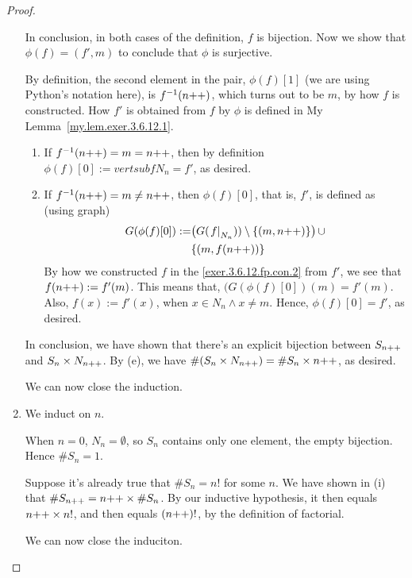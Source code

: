 \begin{proof}
\begin{enumerate}
		In conclusion, in both cases of the definition, $f$ is bijection. Now we show that $\phi(f) = (f', m)$ to conclude that $\phi$ is surjective.

		By definition, the second element in the pair, $\phi(f)[1]$ (we are using Python's notation here), is $f^{-1}(n{+}{+})$, which turns out to be $m$, by how $f$ is constructed.
		How $f'$ is obtained from $f$ by $\phi$ is defined in My Lemma~\ref{my.lem.exer.3.6.12.1}. 
		\begin{enumerate}
			\item If $f^{-1}(n{+}{+}) = m = n{+}{+}$, then by definition $\phi(f)[0] := 
vertsub{f}{N_n} = f'$, as desired.
			\item If $f^{-1}(n{+}{+}) = m \ne n{+}{+}$, then $\phi(f)[0]$, that is, $f'$, is defined as (using graph)
			\begin{align*}
				G(\phi(f)[0]) := &\bigl(G(\left.f\right|_{N_n})) \setminus \{(m, n{+}{+})\}\bigr)\,\cup \\ 
						 &\{(m, f(n{+}{+}))\}
			\end{align*}
			By how we constructed $f$ in the \ref{exer.3.6.12.fp.con.2} from $f'$, we see that $f(n{+}{+}) := f'(m)$. This means that,
			$(G(\phi(f)[0])(m) = f'(m)$. Also, $f(x) := f'(x)$, when $x \in N_n \land x \ne m$. Hence, $\phi(f)[0] = f'$, as desired.
		\end{enumerate}

		In conclusion, we have shown that there's an explicit bijection between $S_{n{+}{+}}$ and $S_n \times N_{n{+}{+}}$. By
		 (e), we have $\#(S_n \times N_{n{+}{+}}) = \#S_n \times n{+}{+}$, as desired.

		We can now close the induction.

	\item 
		We induct on $n$.

		\mybcbox When $n = 0$, $N_n = \emptyset$, so $S_n$ contains only one element, the empty bijection. Hence $\#S_n = 1$.

		\myisbox Suppose it's already true that $\#S_n = n!$ for some $n$. We have shown in (i) that $\#S_{n{+}{+}} = n{+}{+} \times \#S_n$.
		By our inductive hypothesis, it then equals $n{+}{+} \times n!$, and then equals $(n{+}{+})!$, by the definition of factorial.

		We can now close the induciton.

\end{enumerate}
\end{proof}
